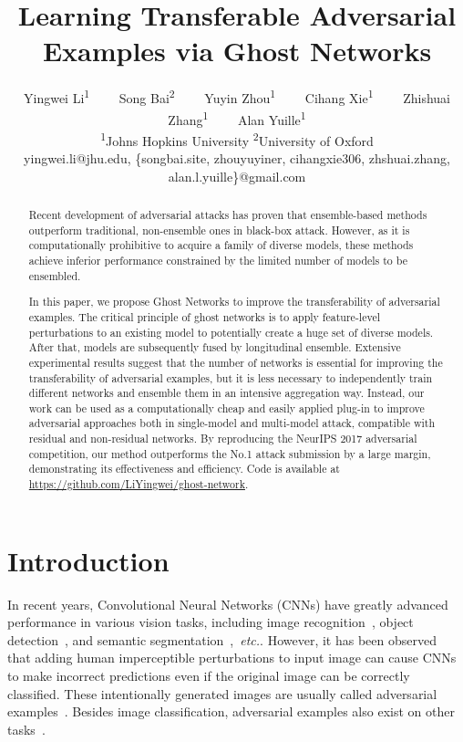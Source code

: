 \documentclass[letterpaper]{article} %
\title{Learning Transferable Adversarial Examples via Ghost Networks}
\author{
Yingwei Li\textsuperscript{\rm 1}~~~~
Song Bai\textsuperscript{\rm 2}~~~~
Yuyin Zhou\textsuperscript{\rm 1}~~~~
Cihang Xie\textsuperscript{\rm 1}~~~~
Zhishuai Zhang\textsuperscript{\rm 1}~~~~
Alan Yuille\textsuperscript{\rm 1} \\
\textsuperscript{\rm 1}Johns Hopkins University \qquad\qquad \textsuperscript{\rm 2}University of Oxford \\
{\normalsize yingwei.li@jhu.edu, \{songbai.site, zhouyuyiner, cihangxie306, zhshuai.zhang, alan.l.yuille\}@gmail.com}
}
\def\etc{\emph{etc.}}
\begin{document}
\maketitle

\begin{abstract}
Recent development of adversarial attacks has proven that ensemble-based methods outperform traditional, non-ensemble ones in black-box attack. However, as it is computationally prohibitive to acquire a family of diverse models, these methods achieve inferior performance constrained by the limited number of models to be ensembled.

In this paper, we propose Ghost Networks to improve the transferability of adversarial examples. The critical principle of ghost networks is to apply feature-level perturbations to an existing model to potentially create a huge set of diverse models. After that, models are subsequently fused by longitudinal ensemble.
Extensive experimental results suggest that the number of networks is essential for improving the transferability of adversarial examples, but it is less necessary to independently train different networks and ensemble them in an intensive aggregation way. Instead, our work can be used as a computationally cheap and easily applied plug-in to improve adversarial approaches both in single-model and multi-model attack, compatible with residual and non-residual networks. By reproducing the NeurIPS 2017 adversarial competition, our method outperforms the No.1 attack submission by a large margin, demonstrating its effectiveness and efficiency. Code is available at \url{https://github.com/LiYingwei/ghost-network}.



\end{abstract}

\section{Introduction} \label{sec:intro}
In recent years, Convolutional Neural Networks (CNNs) have greatly advanced performance in various vision tasks, including image recognition~\cite{he2016identity,krizhevsky2012imagenet,simonyan2015very}, object detection~\cite{Ren_2015_Faster,Girshick_2015_Fast}, and semantic segmentation~\cite{Chen_2016_DeepLab},~\etc. However, it has been observed~\cite{szegedy2013intriguing,goodfellow2014explaining} that adding human imperceptible perturbations to input image can cause CNNs to make incorrect predictions even if the original image can be correctly classified. These intentionally generated images are usually called adversarial examples~\cite{goodfellow2014explaining,kurakin2016adversarial,szegedy2013intriguing}. Besides image classification, adversarial examples also exist on other tasks~\cite{xie2017adversarial,bai2019adversarial,sun2019node,tang2019robust,li2019volumetric}.
\end{document}
